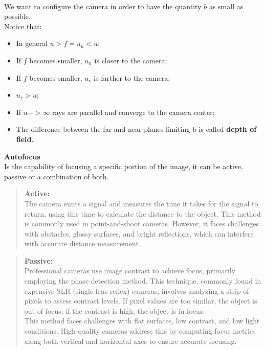 \\We want to configure the camera in order to have the quantity $b$ as small as possible.
\\Notice that:
\begin{itemize}
    \item In general $u > f = u_n < u$;
    \item If $f$ becomes smaller, $u_n$ is closer to the camera;
    \item If $f$ becomes smaller, $u_r$ is farther to the camera;
    \item $u_r > u$;
    \item If $u -> \infty$ rays are parallel and converge to the camera center;
    \item The difference between the far and near planes limiting b is called \textbf{depth of field}. 
\end{itemize}
\textbf{Autofocus}
\\Is the capability of focusing a specific portion of the image, it can be active, passive or a combination of both.
\begin{quote}
    \textbf{Active:}  
    \\The camera emits a signal and measures the time it takes for the signal to return, using this time to calculate the distance to the object. 
    This method is commonly used in point-and-shoot cameras. 
    However, it faces challenges with obstacles, glossy surfaces, and bright reflections, which can interfere with accurate distance measurement.
\end{quote}
\begin{quote}
    \textbf{Passive:}
    \\Professional cameras use image contrast to achieve focus, primarily employing the phase detection method. 
    This technique, commonly found in expensive SLR (single-lens reflex) cameras, involves analyzing a strip of pixels to assess contrast levels. 
    If pixel values are too similar, the object is out of focus; if the contrast is high, the object is in focus.
    \\
    This method faces challenges with flat surfaces, low contrast, and low light conditions. 
    High-quality cameras address this by computing focus metrics along both vertical and horizontal axes to ensure accurate focusing.
\end{quote}
